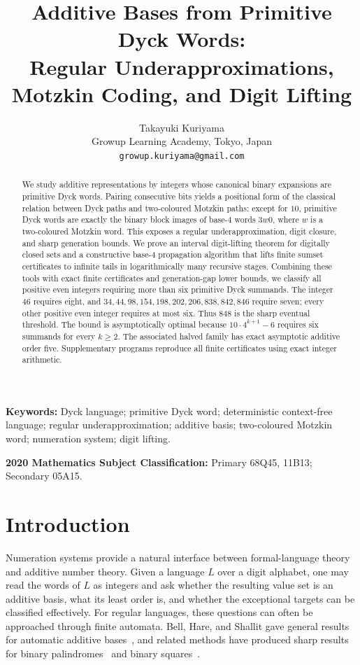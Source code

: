 \documentclass[11pt]{article}
\title{Additive Bases from Primitive Dyck Words:\\
Regular Underapproximations, Motzkin Coding, and Digit Lifting}
\author{Takayuki Kuriyama\\
\small Growup Learning Academy, Tokyo, Japan\\
\small \texttt{growup.kuriyama@gmail.com}}
\date{}
\theoremstyle{plain}
\theoremstyle{definition}
\begin{document}
\maketitle

\begin{abstract}
We study additive representations by integers whose canonical binary
expansions are primitive Dyck words.  Pairing consecutive bits yields a
positional form of the classical relation between Dyck paths and
two-coloured Motzkin paths: except for $10$, primitive Dyck words are
exactly the binary block images of base-$4$ words $3w0$, where $w$ is a
two-coloured Motzkin word.  This exposes a regular underapproximation,
digit closure, and sharp generation bounds.  We prove an interval
digit-lifting theorem for digitally closed sets and a constructive
base-$4$ propagation algorithm that lifts finite sumset certificates to
infinite tails in logarithmically many recursive stages.  Combining these
tools with exact finite certificates and generation-gap lower bounds, we
classify all positive even integers requiring more than six primitive Dyck
summands.  The integer $46$ requires eight, and
$34,44,98,154,198,202,206,838,842,846$ require seven; every other positive
even integer requires at most six.  Thus $848$ is the sharp eventual
threshold.  The bound is asymptotically optimal because
$10\cdot4^{k+1}-6$ requires six summands for every $k\geq2$.  The associated
halved family has exact asymptotic additive order five.  Supplementary
programs reproduce all finite certificates using exact integer arithmetic.
\end{abstract}

\medskip
\noindent\textbf{Keywords:} Dyck language; primitive Dyck word; deterministic context-free
language; regular underapproximation; additive basis; two-coloured Motzkin
word; numeration system; digit lifting.

\noindent\textbf{2020 Mathematics Subject Classification:}
Primary 68Q45, 11B13; Secondary 05A15.

\section{Introduction}\label{sec:introduction}

Numeration systems provide a natural interface between formal-language
theory and additive number theory.  Given a language $L$ over a digit
alphabet, one may read the words of $L$ as integers and ask whether the
resulting value set is an additive basis, what its least order is, and
whether the exceptional targets can be classified effectively.  For
regular languages, these questions can often be approached through finite
automata.  Bell, Hare, and Shallit gave general results for automatic
additive bases~\cite{BHS}, and related methods have produced sharp results
for binary palindromes~\cite{RSS} and binary squares~\cite{MNRS}.
\end{document}

